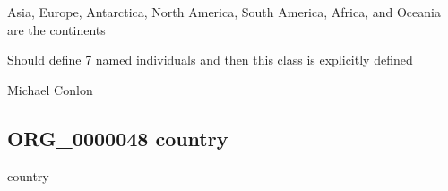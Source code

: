 \documentclass[letterpaper,10pt,english]{sphinxmanual}
\begin{document}
\begin{sphinxShadowBox}

\sphinxAtStartPar
{}
\end{sphinxShadowBox}

\begin{sphinxShadowBox}

\sphinxAtStartPar
Asia, Europe, Antarctica, North America, South America, Africa, and Oceania are the continents
\end{sphinxShadowBox}

\begin{sphinxShadowBox}

\sphinxAtStartPar
Should define 7 named individuals and then this class is explicitly defined
\end{sphinxShadowBox}

\begin{sphinxShadowBox}

\sphinxAtStartPar
{}
\end{sphinxShadowBox}

\begin{sphinxShadowBox}

\sphinxAtStartPar
Michael Conlon 
\end{sphinxShadowBox}
\begin{quote}

\ignorespaces \end{quote}


\subsection{ORG\_0000048 \sphinxhyphen{} country}
\label{\detokenize{doc-ORG_0000048:org-0000048-country}}\label{\detokenize{doc-ORG_0000048:index-0}}\label{\detokenize{doc-ORG_0000048::doc}}
\begin{sphinxShadowBox}

\sphinxAtStartPar
country
\end{sphinxShadowBox}
\end{document}
